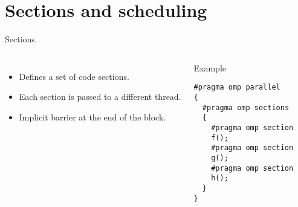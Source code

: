 \section{Sections and scheduling}

\begin{frame}[t,fragile]{Sections}
\begin{columns}[T]

\begin{itemize}
  \item Defines a set of code sections.
  \item Each section is passed to a different thread.
  \item Implicit barrier at the end of the  block.
\end{itemize}

\begin{block}{Example}
\begin{lstlisting}
#pragma omp parallel
{
  #pragma omp sections
  {
    #pragma omp section
    f();
    #pragma omp section
    g();
    #pragma omp section
    h();
  }
}
\end{lstlisting}
\end{block}

\end{columns}
\end{frame}

